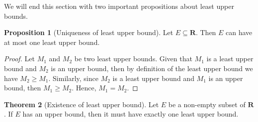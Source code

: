 \documentclass[tikz,12pt,a4paper]{article}
\theoremstyle{definition}
\newtheorem{theorem}{Theorem}[section]
\newtheorem{proposition}[theorem]{Proposition}
\newtheorem{example}{Example}[section]
\begin{document}

We will end this section with two important propositions about least upper bounds.

\begin{proposition}[Uniqueness of least upper bound]
  Let $E \subseteq \textbf{R}$. Then $E$ can have at most one least upper bound.
\end{proposition}

\begin{proof}
  Let $M_1$ and $M_2$ be two least upper bounds. Given that $M_1$ is a least upper bound and $M_2$ is an upper bound, then by definition of the least upper bound we have $M_2 \geq M_1$. Similarly, since $M_2$ is a least upper bound and $M_1$ is an upper bound, then $M_1 \geq M_2$. Hence, $M_1 = M_2$. 
\end{proof}

\begin{theorem}[Existence of least upper bound]
  Let $E$ be a non-empty subset of $\textbf{R}$. If $E$ has an upper bound, then it must have exactly one least upper bound.
\end{theorem}
\end{document}
